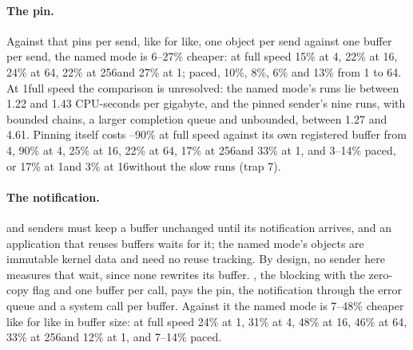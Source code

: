 \paragraph{The pin.} Against \sendzc that pins per send, like for like, one object per send
against one buffer per send, the named mode is 6--27\% cheaper: at full speed 15\% at 4\KiB,
22\% at 16\KiB, 24\% at 64\KiB, 22\% at 256\KiB and 27\% at 1\MiB; paced, 10\%, 8\%, 6\% and
13\% from 1 to 64\KiB. At 1\KiB full speed the comparison is unresolved: the named mode's runs
lie between 1.22 and 1.43 CPU-seconds per gigabyte, and the pinned sender's nine runs, with
bounded chains, a larger completion queue and unbounded, between 1.27 and 4.61.
Pinning itself costs --90\% at full speed against its own registered buffer from
4\KiB, 90\% at 4\KiB, 25\% at 16\KiB, 22\% at 64\KiB, 17\% at 256\KiB and 33\% at 1\MiB, and
3--14\% paced, or 17\% at 1\KiB and 3\% at 16\KiB without the slow runs (trap 7).

\paragraph{The notification.} \sendzc and \msgzc senders must keep a buffer unchanged until its
notification arrives, and an application that reuses buffers waits for it; the named mode's
objects are immutable kernel data and need no reuse tracking. By design, no sender here
measures that wait, since none rewrites its buffer. %
\msgzc, the blocking  with the zero-copy flag and one buffer per call, pays the
pin, the notification through the error queue and a system call per buffer. Against it the named
mode is 7--48\% cheaper like for like in buffer size: at full speed 24\% at 1\KiB, 31\% at
4\KiB, 48\% at 16\KiB, 46\% at 64\KiB, 33\% at 256\KiB and 12\% at 1\MiB, and 7--14\%
paced. %

